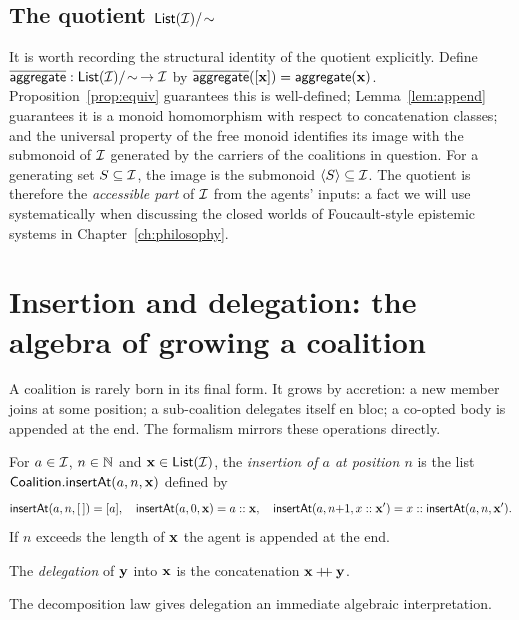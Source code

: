 \subsection*{The quotient $\mathsf{List}(\mathcal{I})/\!\sim$}

It is worth recording the structural identity of the quotient
explicitly. Define $\overline{\mathsf{aggregate}} :
\mathsf{List}(\mathcal{I})/\!\sim\, \to \mathcal{I}$ by $\overline{\mathsf{aggregate}}([\mathbf{x}]) =
\mathsf{aggregate}(\mathbf{x})$. Proposition~\ref{prop:equiv} guarantees this is
well-defined; Lemma~\ref{lem:append} guarantees it is a monoid
homomorphism with respect to concatenation classes; and the universal
property of the free monoid identifies its image with the submonoid of
$\mathcal{I}$ generated by the carriers of the coalitions in question. For
a generating set $S \subseteq \mathcal{I}$, the image is the submonoid
$\langle S \rangle \subseteq \mathcal{I}$. The quotient is therefore the
\emph{accessible part} of $\mathcal{I}$ from the agents' inputs: a fact we
will use systematically when discussing the closed worlds of
Foucault-style epistemic systems in Chapter~\ref{ch:philosophy}.

\section{Insertion and delegation: the algebra of growing a coalition}
\label{sec:insertion}

A coalition is rarely born in its final form. It grows by accretion:
a new member joins at some position; a sub-coalition delegates
itself en bloc; a co-opted body is appended at the end. The
formalism mirrors these operations directly.

\begin{definition}\label{def:insert}
For $a \in \mathcal{I}$, $n \in \mathbb{N}$ and $\mathbf{x} \in \mathsf{List}(\mathcal{I})$,
the \emph{insertion of $a$ at position $n$} is the list
$\mathsf{Coalition}.\mathsf{insertAt}(a, n, \mathbf{x})$ defined by
\[
  \mathsf{insertAt}(a, n, [\,]) = [a],
  \quad
  \mathsf{insertAt}(a, 0, \mathbf{x}) = a :: \mathbf{x},
  \quad
  \mathsf{insertAt}(a, n{+}1, x :: \mathbf{x}') = x :: \mathsf{insertAt}(a, n, \mathbf{x}').
\]
If $n$ exceeds the length of $\mathbf{x}$ the agent is appended at the end.
\end{definition}

\begin{definition}[Delegation]\label{def:delegate}
The \emph{delegation} of $\mathbf{y}$ into $\mathbf{x}$ is the concatenation
$\mathbf{x} \mathbin{+\!\!+} \mathbf{y}$.
\end{definition}

The decomposition law gives delegation an immediate algebraic interpretation.

